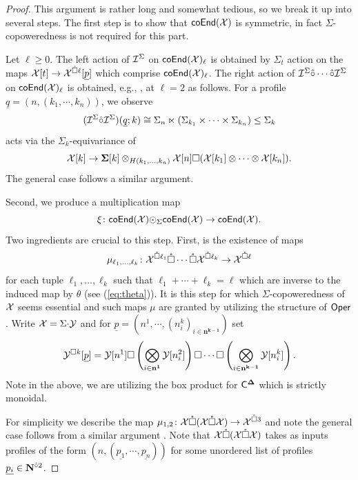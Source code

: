 \begin{proof}
    This argument is rather long and somewhat tedious, so we break it up into several steps. The first step is to show that $\mathsf{coEnd}(\mathcal{X})$ is symmetric, in fact $\Sigma$-copoweredness is not required for this part. 
    
    Let $\ell\geq 0$. The left action of $\mathcal{I}^{\Sigma}$ on $\mathsf{coEnd}(\mathcal{X})_{\ell}$ is obtained by $\Sigma_t$ action on the maps $\mathcal{X}[t]\to \mathcal{X}^{\mathring{\square} \ell}[\underline{p}]$ which comprise $\mathsf{coEnd}(\mathcal{X})_{\ell}$. The right action of $\mathcal{I}^{\Sigma}\hat{\circ} \cdots \hat{\circ} \mathcal{I}^{\Sigma}$ on $\mathsf{coEnd}(\mathcal{X})_{\ell}$ is obtained, e.g., , at $\ell=2$ as follows. For a profile $\underline{q}=(n,(k_1,\cdots,k_n))$, we observe \[(\mathcal{I}^{\Sigma}\hat{\circ} \mathcal{I}^{\Sigma})(\underline{q};k)\cong \Sigma_n\ltimes (\Sigma_{k_1} \times \cdots \times \Sigma_{k_n}) \leq \Sigma_k\] acts via the $\Sigma_k$-equivariance of \[ 
        \mathcal{X}[k] \to \mathbf{\Sigma}[k]\otimes_{H(k_1,\dots,k_n)} \mathcal{X}[n] \square (\mathcal{X}[k_1] \otimes\cdots \otimes \mathcal{X}[k_n]).
    \] 
    The general case follows a similar argument. 
    
    Second, we produce a multiplication map \[\xi\colon \mathsf{coEnd}(\mathcal{X}){\odot}_{\Sigma} \mathsf{coEnd}(\mathcal{X})\to \mathsf{coEnd}(\mathcal{X}).\] Two ingredients are crucial to this step. First, is the existence of maps \begin{equation} \mu_{\ell_1,\dots,\ell_k} \colon \mathcal{X}^{\mathring{\square} \ell_1} \mathring{\square} \cdots \mathring{\square} \mathcal{X}^{\mathring{\square} \ell_k} \to \mathcal{X}^{\mathring{\square} \ell}\end{equation} 
    for each tuple $\ell_1,\dots,\ell_k$ such that $\ell_1+\cdots + \ell_k=\ell$ which are inverse to the induced map by $\theta$ (see (\ref{eq:theta})). It is this step for which $\Sigma$-copoweredness of $\mathcal{X}$ seems essential and such maps $\mu$ are granted by utilizing the structure of $\mathsf{Oper}$. Write $\mathcal{X}=\Sigma {\cdot} \mathcal{Y}$ and for $\underline{p}=(n^1, \cdots, (n^k_i)_{i\in \mathbf{n^{k-1}}})$ set \[ \mathcal{Y}^{\square k}[\underline{p}]=\mathcal{Y}[n^1] \square \left(\bigotimes_{i\in \mathbf{n^1}} \mathcal{Y}[n^2_i] \right) \square \cdots \square \left( \bigotimes_{i\in \mathbf{n^{k-1}}} \mathcal{Y}[n^k_i] \right).\]
    Note in the above, we are utilizing the box product for $\mathsf{C}^{\mathbf{\Delta}}$ which is strictly monoidal. 
    
    For simplicity we describe the map $\mu_{1,2}\colon \mathcal{X} \mathring{\square} (\mathcal{X} \mathring{\square} \mathcal{X})\to \mathcal{X}^{\mathring{\square} 3}$ and note the general case follows from a similar argument . Note that $\mathcal{X} \mathring{\square} (\mathcal{X} \mathring{\square} \mathcal{X})$ takes as inputs profiles of the form $(n,(\underline{p_1},\cdots, \underline{p_n}))$ for some unordered list of profiles $\underline{p_i}\in \mathbf{N}^{\hat{\circ}2}$. 
    

\end{proof}

